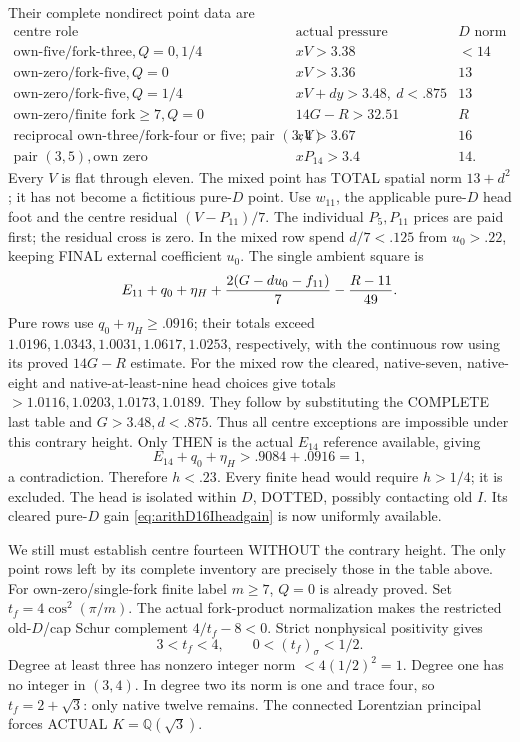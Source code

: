 \documentclass[11pt]{article}
\begin{document}
Their complete nondirect point data are
\[
\begin{array}{c|c|c}
 \text{centre role}&\text{actual pressure}&D\text{ norm}\\ \hline
 \text{own-five/fork-three},Q=0,1/4&xV>3.38&<14\\
 \text{own-zero/fork-five},Q=0&xV>3.36&13\\
 \text{own-zero/fork-five},Q=1/4&xV+d y>3.48,\ d<.875&13\\
 \text{own-zero/finite fork}\ge7,Q=0&
                    14G-R>32.51&R\\
 \text{reciprocal own-three/fork-four or five; pair }(3,4)&xV>3.67&16\\
 \text{pair }(3,5),\text{own zero}&xP_{14}>3.4&14 .
\end{array}
\]
Every \(V\) is flat through eleven.
The mixed point has TOTAL spatial
norm \(13+d^2\); it has not become
a fictitious pure-\(D\) point.
Use \(w_{11}\), the applicable pure-\(D\)
head foot and the centre residual
\((V-P_{11})/7\).
The individual \(P_5,P_{11}\) prices
are paid first; the residual cross
is zero.
In the mixed row spend \(d/7<.125\)
from \(u_0>.22\), keeping FINAL external
coefficient \(u_0\).
The single ambient square is
\[
 E_{11}+q_0+\eta_H+
           {2(G-d u_0-f_{11})\over7}-{R-11\over49}.
\]
Pure rows use \(q_0+\eta_H\ge.0916\);
their totals exceed
\(1.0196,1.0343,1.0031,1.0617,1.0253\),
respectively, with the continuous row
using its proved \(14G-R\) estimate.
For the mixed row the cleared, native-seven,
native-eight and native-at-least-nine
head choices give totals \(>1.0116,
1.0203,1.0173,1.0189\).
They follow by substituting the COMPLETE
last table and \(G>3.48,d<.875\).
Thus all centre exceptions are impossible
under this contrary height.
Only THEN is the actual \(E_{14}\)
reference available, giving
\[
                         E_{14}+q_0+\eta_H>.9084+.0916=1 ,
\]
a contradiction.
Therefore \(h<.23\).
Every finite head would require \(h>1/4\);
it is excluded.
The head is isolated within \(D\),
DOTTED, possibly contacting old \(I\).
Its cleared pure-\(D\) gain
\eqref{eq:arithD16Iheadgain} is now
uniformly available.

We still must establish centre fourteen
WITHOUT the contrary height.
The only point rows left by its complete
inventory are precisely those in the
table above.
For own-zero/single-fork finite label
\(m\ge7\), \(Q=0\) is already proved.
Set \(t_f=4\cos^2(\pi/m)\).
The actual fork-product normalization
makes the restricted old-\(D\)/cap
Schur complement \(4/t_f-8<0\).
Strict nonphysical positivity gives
\[
                          3<t_f<4,\qquad0<(t_f)_\sigma<1/2 .
\]
Degree at least three has nonzero
integer norm \(<4(1/2)^2=1\).
Degree one has no integer in \((3,4)\).
In degree two its norm is one and
trace four, so
\(t_f=2+\sqrt3\): only native twelve
remains.
The connected Lorentzian principal
forces ACTUAL \(K=\mathbb Q(\sqrt3)\).
\end{document}
